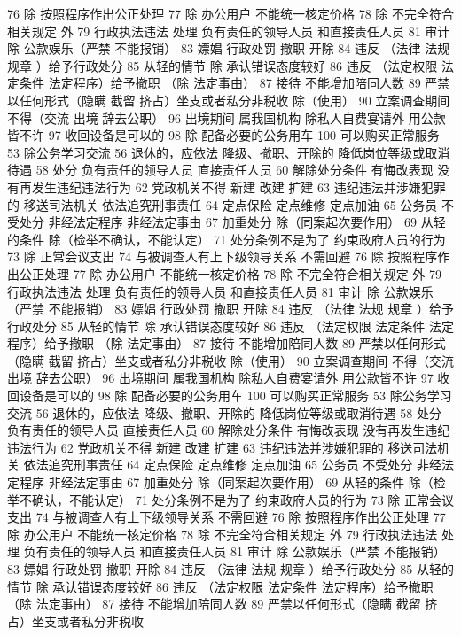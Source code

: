 \documentclass[cyan]{elegantnote}
\begin{document}
76 除 按照程序作出公正处理
77 除 办公用户
不能统一核定价格
78 除 不完全符合相关规定 外
79 行政执法违法 处理
负有责任的领导人员
和直接责任人员
81 审计
除 公款娱乐（严禁 不能报销）
83 嫖娼 行政处罚
撤职 开除
84 违反 （法律 法规 规章 ）给予行政处分
85 从轻的情节
除 承认错误态度较好
86 违反 （法定权限 法定条件 法定程序）给予撤职
（除 法定事由）
87 接待 不能增加陪同人数
89 严禁以任何形式（隐瞒 截留 挤占）坐支或者私分非税收
除（使用）
90 立案调查期间 不得（交流 出境 辞去公职）
96 出境期间 属我国机构 除私人自费宴请外 用公款皆不许
97 收回设备是可以的
98 除 配备必要的公务用车
100 可以购买正常服务
53 除公务学习交流
56 退休的，应依法
降级、撤职、开除的 降低岗位等级或取消待遇
58 处分
负有责任的领导人员
直接责任人员
60 解除处分条件
有悔改表现
没有再发生违纪违法行为
62 党政机关不得
新建 改建 扩建
63 违纪违法并涉嫌犯罪的
移送司法机关
依法追究刑事责任
64 定点保险 定点维修 定点加油
65 公务员 不受处分
非经法定程序
非经法定事由
67 加重处分
除（同案起次要作用）
69 从轻的条件
除（检举不确认，不能认定）
71 处分条例不是为了
约束政府人员的行为
73 除 正常会议支出
74 与被调查人有上下级领导关系 不需回避
76 除 按照程序作出公正处理
77 除 办公用户
不能统一核定价格
78 除 不完全符合相关规定 外
79 行政执法违法 处理
负有责任的领导人员
和直接责任人员
81 审计
除 公款娱乐（严禁 不能报销）
83 嫖娼 行政处罚
撤职 开除
84 违反 （法律 法规 规章 ）给予行政处分
85 从轻的情节
除 承认错误态度较好
86 违反 （法定权限 法定条件 法定程序）给予撤职
（除 法定事由）
87 接待 不能增加陪同人数
89 严禁以任何形式（隐瞒 截留 挤占）坐支或者私分非税收
除（使用）
90 立案调查期间 不得（交流 出境 辞去公职）
96 出境期间 属我国机构 除私人自费宴请外 用公款皆不许
97 收回设备是可以的
98 除 配备必要的公务用车
100 可以购买正常服务
53 除公务学习交流
56 退休的，应依法
降级、撤职、开除的 降低岗位等级或取消待遇
58 处分
负有责任的领导人员
直接责任人员
60 解除处分条件
有悔改表现
没有再发生违纪违法行为
62 党政机关不得
新建 改建 扩建
63 违纪违法并涉嫌犯罪的
移送司法机关
依法追究刑事责任
64 定点保险 定点维修 定点加油
65 公务员 不受处分
非经法定程序
非经法定事由
67 加重处分
除（同案起次要作用）
69 从轻的条件
除（检举不确认，不能认定）
71 处分条例不是为了
约束政府人员的行为
73 除 正常会议支出
74 与被调查人有上下级领导关系 不需回避
76 除 按照程序作出公正处理
77 除 办公用户
不能统一核定价格
78 除 不完全符合相关规定 外
79 行政执法违法 处理
负有责任的领导人员
和直接责任人员
81 审计
除 公款娱乐（严禁 不能报销）
83 嫖娼 行政处罚
撤职 开除
84 违反 （法律 法规 规章 ）给予行政处分
85 从轻的情节
除 承认错误态度较好
86 违反 （法定权限 法定条件 法定程序）给予撤职
（除 法定事由）
87 接待 不能增加陪同人数
89 严禁以任何形式（隐瞒 截留 挤占）坐支或者私分非税收
\end{document}
